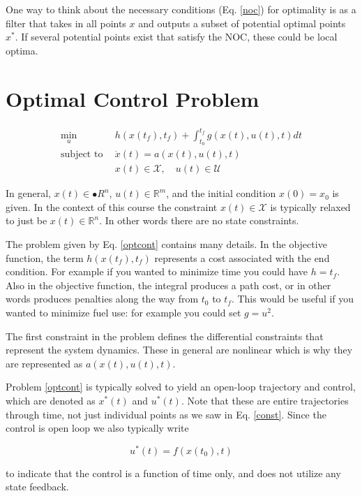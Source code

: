 \documentclass[twoside]{article}
\begin{document}
One way to think about the necessary conditions (Eq. \ref{noc}) for optimality is as a filter that takes in all points $x$ and outputs a subset of potential optimal points $x^*$. If several potential points exist that satisfy the NOC, these could be local optima.

\section{Optimal Control Problem}

\begin{equation} \label{optcont}
\begin{split}
\underset{u}{\text{min}} \:\: &h(x(t_f),t_f) + \int_{t_0}^{t_f} g(x(t),u(t),t) dt \\
\text{subject to} \:\: &\dot{x}(t) = a(x(t),u(t),t) \\
&x(t) \in \mathcal{X}, \quad u(t) \in \mathcal{U}
\end{split}
\end{equation}

In general, $x(t) \in \mathbb{•}{R}^n$, $u(t) \in \mathbb{R}^m$, and the initial condition $x(0) = x_0$ is given. In the context of this course the constraint $x(t) \in \mathcal{X}$ is typically relaxed to just be $x(t) \in \mathbb{R}^n$. In other words there are no state constraints.

The problem given by Eq. \ref{optcont} contains many details. In the objective function, the term $h(x(t_f),t_f)$ represents a cost associated with the end condition. For example if you wanted to minimize time you could have $h = t_f$. Also in the objective function, the integral produces a path cost, or in other words produces penalties along the way from $t_0$ to $t_f$. This would be useful if you wanted to minimize fuel use: for example you could set $g = u^2$.

The first constraint in the problem defines the differential constraints that represent the system dynamics. These in general are nonlinear which is why they are represented as $a(x(t),u(t),t)$.

Problem \ref{optcont} is typically solved to yield an open-loop trajectory and control, which are denoted as $x^*(t)$ and $u^*(t)$. Note that these are entire trajectories through time, not just individual points as we saw in Eq. \ref{const}. Since the control is open loop we also typically write 

$$u^*(t) = f(x(t_0),t)$$

to indicate that the control is a function of time only, and does not utilize any state feedback.
\end{document}
